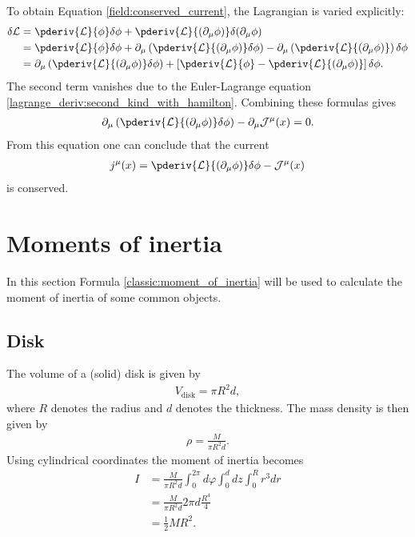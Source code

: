     To obtain Equation \eqref{field:conserved_current}, the Lagrangian is varied explicitly:
    \begin{align*}
        \delta\mathcal{L} &= \pderiv{\mathcal{L}}{\phi}\delta\phi + \pderiv{\mathcal{L}}{(\partial_\mu\phi)}\delta(\partial_\mu\phi)\\
        &= \pderiv{\mathcal{L}}{\phi}\delta\phi + \partial_\mu\left(\pderiv{\mathcal{L}}{(\partial_\mu\phi)}\delta\phi\right) - \partial_\mu\left(\pderiv{\mathcal{L}}{(\partial_\mu\phi)}\right)\delta\phi\\
        &= \partial_\mu\left(\pderiv{\mathcal{L}}{(\partial_\mu\phi)}\delta\phi\right) + \left[\pderiv{\mathcal{L}}{\phi} - \pderiv{\mathcal{L}}{(\partial_\mu\phi)}\right]\delta\phi.
    \end{align*}
    The second term vanishes due to the Euler-Lagrange equation \eqref{lagrange_deriv:second_kind_with_hamilton}. Combining these formulas gives
    \begin{gather}
        \partial_\mu\left(\pderiv{\mathcal{L}}{(\partial_\mu\phi)}\delta\phi\right) - \partial_\mu\mathcal{J}^\mu(x) = 0.
    \end{gather}
    From this equation one can conclude that the current
    \begin{gather}
        j^\mu(x) = \pderiv{\mathcal{L}}{(\partial_\mu\phi)}\delta\phi - \mathcal{J}^\mu(x)
    \end{gather}
    is conserved.

\section{Moments of inertia}\label{deriv:inertia}

    In this section Formula \ref{classic:moment_of_inertia} will be used to calculate the moment of inertia of some common objects.

\subsection{Disk}

    The volume of a (solid) disk is given by
    \begin{gather}
        V_\mathrm{disk} = \pi R^2d,
    \end{gather}
    where $R$ denotes the radius and $d$ denotes the thickness. The mass density is then given by
    \begin{gather}
        \rho = \frac{M}{\pi R^2d}.
    \end{gather}
    Using cylindrical coordinates the moment of inertia becomes
    \begin{align}
        I &= \frac{M}{\pi R^2d}\int_0^{2\pi}d\varphi\int_0^ddz\int_0^Rr^3dr\nonumber\\
        &= \frac{M}{\pi R^2d}2\pi d\frac{R^4}{4}\nonumber\\
        &= \frac{1}{2}MR^2.
    \end{align}

